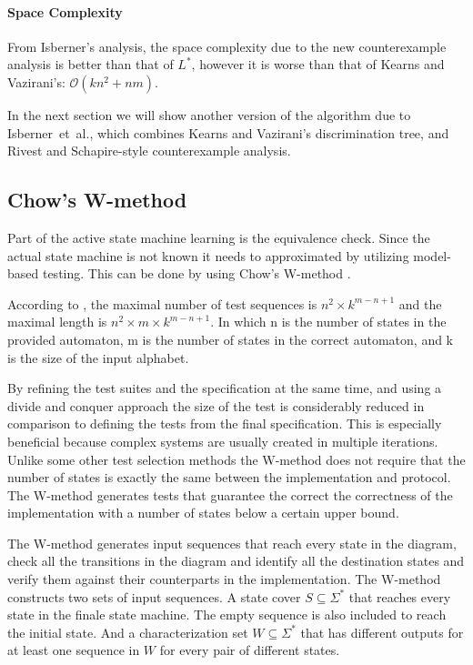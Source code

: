 \documentclass[multi,crop=false,class=article]{standalone}
\begin{document}
\paragraph{Space Complexity} From Isberner's analysis\cite{Isberner14b}, the
space complexity due to the new counterexample analysis is better than that of
$L^*$, however it is worse than that of Kearns and Vazirani's:
$\mathcal{O}(kn^2 + nm)$.

In the next section we will show another version of the algorithm due to
Isberner~et~al., which combines Kearns and Vazirani's discrimination tree, and
Rivest and Schapire-style counterexample analysis.

\subsection{Chow's W-method}
Part of the active state machine learning is the equivalence check.
Since the actual state machine is not known it needs to approximated by
utilizing model-based testing.
This can be done by using Chow's W-method \cite{deRuiter15, Chow78}.

According to \cite{vasilevskii73}, the maximal number of test sequences is 
$n^{2} \times k^{m-n+1}$ and the maximal length is 
$n^{2} \times m \times k^{m-n+1}$.
In which n is the number of states in the provided automaton, m is the number
of states in the correct automaton, and k is the size of the input alphabet.

By refining the test suites and the specification at the same time, and
using a divide and conquer approach the size of the test is
considerably reduced in comparison to defining the tests from
the final specification\cite{Ipate07}.
This is especially beneficial because complex systems are usually
created in multiple iterations.
Unlike some other test selection methods the W-method does not require
that the number of states is exactly the same between
the implementation and protocol.
The W-method generates tests that guarantee the correct the
correctness of the implementation with a number of states below a
certain upper bound.

The W-method generates input sequences that reach every state in the
diagram, check all the transitions in the diagram and identify all the
destination states and verify them against their counterparts in
the implementation\cite{Ipate07}.
The W-method constructs two sets of input sequences.
A state cover $S \subseteq \Sigma^{*}$ that reaches every state in the
finale state machine.
The empty sequence is also included to reach the initial state.
And a characterization set $W \subseteq \Sigma^{*}$ that has different
outputs for at least one sequence in $W$ for every pair of different states.
\end{document}
